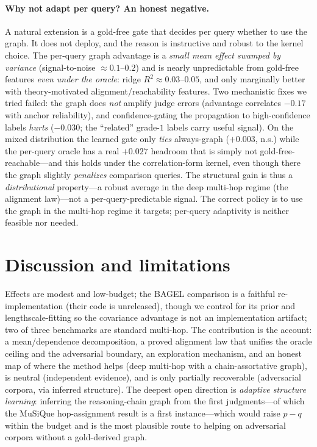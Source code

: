 \documentclass[11pt]{article}
\theoremstyle{plain}\newtheorem{theorem}{Theorem}\newtheorem{lemma}{Lemma}\newtheorem{proposition}{Proposition}
\theoremstyle{definition}\newtheorem{assumption}{Assumption}\newtheorem{remark}{Remark}
\begin{document}
\paragraph{Why not adapt per query? An honest negative.} A natural extension is a gold-free gate that decides
per query whether to use the graph. It does not deploy, and the reason is instructive and robust to the kernel
choice. The per-query graph advantage is a \emph{small mean effect swamped by variance} (signal-to-noise
$\approx0.1$--$0.2$) and is nearly unpredictable from gold-free features \emph{even under the oracle}: ridge
$R^2\approx0.03$--$0.05$, and only marginally better with theory-motivated alignment/reachability features. Two
mechanistic fixes we tried failed: the graph does \emph{not} amplify judge errors (advantage correlates $-0.17$
with anchor reliability), and confidence-gating the propagation to high-confidence labels \emph{hurts} ($-0.030$;
the ``related'' grade-$1$ labels carry useful signal). On the mixed distribution the learned gate only \emph{ties}
always-graph ($+0.003$, n.s.) while the per-query oracle has a real $+0.027$ headroom that is simply not
gold-free-reachable---and this holds under the correlation-form kernel, even though there the graph slightly
\emph{penalizes} comparison queries. The structural gain is thus a \emph{distributional} property---a robust
average in the deep multi-hop regime (the alignment law)---not a per-query-predictable signal. The correct policy
is to use the graph in the multi-hop regime it targets; per-query adaptivity is neither feasible nor needed.

\section{Discussion and limitations}\label{sec:disc}
Effects are modest and low-budget; the BAGEL comparison is a faithful re-implementation (their code is unreleased),
though we control for its prior and lengthscale-fitting so the covariance advantage is not an implementation
artifact; two of three benchmarks are standard multi-hop. The contribution is the account: a mean/dependence decomposition, a proved alignment law that unifies
the oracle ceiling and the adversarial boundary, an exploration mechanism, and an honest map of where the method
helps (deep multi-hop with a chain-assortative graph), is neutral (independent evidence), and is only partially
recoverable (adversarial corpora, via inferred structure). The deepest open direction is \emph{adaptive structure
learning}: inferring the reasoning-chain graph from the first judgments---of which the MuSiQue hop-assignment
result is a first instance---which would raise $p-q$ within the budget and is the most plausible route to helping
on adversarial corpora without a gold-derived graph.
\end{document}
